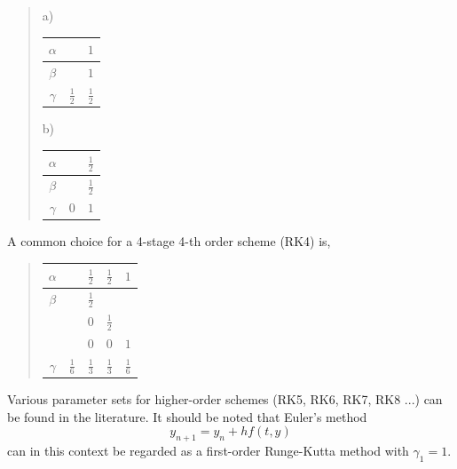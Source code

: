 \documentclass[a4paper]{article}
\begin{document}
\begin{quote}
a) \begin{tabular}{c|cc}
$\alpha$ & & $1$ \\ \hline
$\beta$ & & $1$ \\ \hline
$\gamma$ & $\frac{1}{2}$ & $\frac{1}{2}$
\end{tabular}\qquad
b) \begin{tabular}{c|cc}
$\alpha$ & & $\frac{1}{2}$ \\ \hline
$\beta$ & & $\frac{1}{2}$ \\ \hline
$\gamma$ & $0$ & $1$
\end{tabular}
\end{quote}
A common choice for a 4-stage 4-th order scheme (RK4) is,
\begin{quote}
\begin{tabular}{c|cccc}
$\alpha$ & & $\frac{1}{2}$ & $\frac{1}{2}$ & $1$ \\ \hline
$\beta$ & & $\frac{1}{2}$ & & \\
        & & $0$ & $\frac{1}{2}$ & \\
        & & $0$ & $0$ & $1$ \\ \hline
$\gamma$ & $\frac{1}{6}$ & $\frac{1}{3}$ & $\frac{1}{3}$ & $\frac{1}{6}$
\end{tabular}
\end{quote}
Various parameter sets for higher-order schemes (RK5, RK6, RK7, RK8 ...) can be found in the literature.
It should be noted that Euler's method
\begin{equation*}
y_{n+1} = y_n + h f(t,y)
\end{equation*}
can in this context be regarded as a first-order Runge-Kutta method with $\gamma_1 = 1$.
\end{document}
